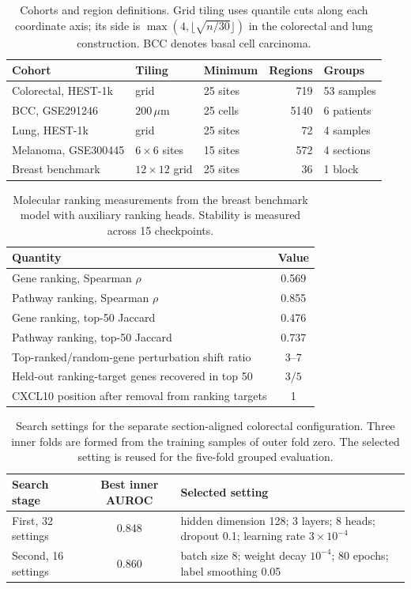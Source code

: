 \begin{table}[!ht]
\centering
\caption{Cohorts and region definitions. Grid tiling uses quantile cuts along each coordinate
axis; its side is $\max(4,\lfloor\sqrt{n/30}\rfloor)$ in the colorectal and lung construction.
BCC denotes basal cell carcinoma.}
\label{tab:regions}
\small
\begin{tabularx}{\linewidth}{@{}Xllrl@{}}
\toprule
Cohort & Tiling & Minimum & Regions & Groups \\
\midrule
Colorectal, HEST-1k & grid & 25 sites & 719 & 53 samples \\
BCC, GSE291246 & $200\,\mu$m & 25 cells & 5140 & 6 patients \\
Lung, HEST-1k & grid & 25 sites & 72 & 4 samples \\
Melanoma, GSE300445 & $6\times6$ sites & 15 sites & 572 & 4 sections \\
Breast benchmark & $12\times12$ grid & 25 sites & 36 & 1 block \\
\bottomrule
\end{tabularx}
\end{table}

\begin{table}[!ht]
\centering
\caption{Molecular ranking measurements from the breast benchmark model with auxiliary ranking
heads. Stability is measured across 15 checkpoints.}
\label{tab:rank}
\small
\begin{tabularx}{\linewidth}{@{}Xc@{}}
\toprule
Quantity & Value \\
\midrule
Gene ranking, Spearman $\rho$ & 0.569 \\
Pathway ranking, Spearman $\rho$ & 0.855 \\
Gene ranking, top-50 Jaccard & 0.476 \\
Pathway ranking, top-50 Jaccard & 0.737 \\
Top-ranked/random-gene perturbation shift ratio & $3$--$7$ \\
Held-out ranking-target genes recovered in top 50 & $3/5$ \\
CXCL10 position after removal from ranking targets & 1 \\
\bottomrule
\end{tabularx}
\end{table}

\begin{table}[!ht]
\centering
\caption{Search settings for the separate section-aligned colorectal configuration. Three
inner folds are formed from the training samples of outer fold zero. The selected setting is
reused for the five-fold grouped evaluation.}
\label{tab:tune}
\small
\begin{tabularx}{\linewidth}{@{}p{2.5cm}cX@{}}
\toprule
Search stage & Best inner AUROC & Selected setting \\
\midrule
First, 32 settings & 0.848 & hidden dimension 128; 3 layers; 8 heads; dropout 0.1;
learning rate $3\times10^{-4}$ \\
Second, 16 settings & 0.860 & batch size 8; weight decay $10^{-4}$; 80 epochs;
label smoothing 0.05 \\
\bottomrule
\end{tabularx}
\end{table}

